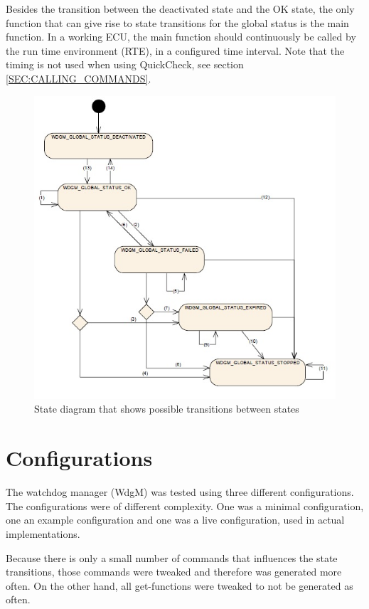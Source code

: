 Besides the transition between the deactivated state and the OK state,
the only function that can give rise to state transitions for the
global status is the main function. In a working ECU, the main
function should continuously be called by the run time environment
(RTE), in a configured time interval. Note that the timing is not used
when using QuickCheck, see section \ref{SEC:CALLING_COMMANDS}.

\begin{figure}[h!]
  \begin{center}
    \includegraphics{pictures/globalstatuses.jpg}
  \end{center}
  \caption{State diagram that shows possible transitions between states}
  \label{FIG:GLOBALSTATUSES}
\end{figure}

\section{Configurations}
The watchdog manager (WdgM) was tested using three different
configurations. The configurations were of different complexity. One
was a minimal configuration, one an example configuration and one was
a live configuration, used in actual implementations.

Because there is only a small number of commands that influences the
state transitions, those commands were tweaked and therefore was
generated more often. On the other hand, all get-functions were
tweaked to not be generated as often.

